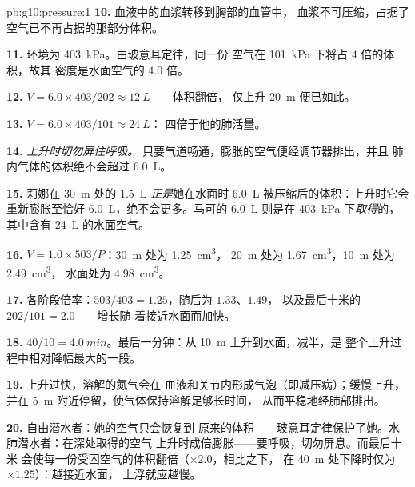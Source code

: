 \begin{solution}{pb:g10:pressure:1}
\textbf{10.} 血液中的血浆转移到胸部的血管中，
血浆不可压缩，占据了空气已不再占据的那部分体积。

\textbf{11.} 环境为 \qty{403}{kPa}。由玻意耳定律，同一份
空气在 \qty{101}{kPa} 下将占 $4$ 倍的体积，故其
密度是水面空气的 $4.0$ 倍。

\textbf{12.} $V = 6.0 \times 403/202 \approx \qty{12}{L}$——体积翻倍，
仅上升 \qty{20}{m} 便已如此。

\textbf{13.} $V = 6.0 \times 403/101 \approx \qty{24}{L}$：
四倍于他的肺活量。

\textbf{14.} \emph{上升时切勿屏住呼吸。}
只要气道畅通，膨胀的空气便经调节器排出，并且
肺内气体的体积绝不会超过 \qty{6.0}{L}。

\textbf{15.} 莉娜在 \qty{30}{m} 处的 \qty{1.5}{L} \emph{正是}她在水面时
\qty{6.0}{L} 被压缩后的体积：上升时它会重新膨胀至恰好
\qty{6.0}{L}，绝不会更多。马可的 \qty{6.0}{L} 则是在
\qty{403}{kPa} 下\emph{取得}的，其中含有 \qty{24}{L} 的水面空气。

\textbf{16.} $V = 1.0 \times 503/P$：\qty{30}{m} 处为 \qty{1.25}{cm^3}，
\qty{20}{m} 处为 \qty{1.67}{cm^3}，\qty{10}{m} 处为 \qty{2.49}{cm^3}，
水面处为 \qty{4.98}{cm^3}。

\textbf{17.} 各阶段倍率：$503/403 = 1.25$，随后为 $1.33$、$1.49$，
以及最后十米的 $202/101 = 2.0$——增长随
着接近水面而加快。

\textbf{18.} $40/10 = \qty{4.0}{min}$。最后一分钟：从
\qty{10}{m} 上升到水面，减半，是
整个上升过程中相对降幅最大的一段。

\textbf{19.} 上升过快，溶解的氮气会在
血液和关节内形成气泡（即减压病）；缓慢上升，
并在 \qty{5}{m} 附近停留，使气体保持溶解足够长时间，
从而平稳地经肺部排出。

\textbf{20.} 自由潜水者：她的空气只会恢复到
原来的体积——玻意耳定律保护了她。水肺潜水者：在深处取得的空气
上升时成倍膨胀——要呼吸，切勿屏息。而最后十米
会使每一份受困空气的体积翻倍（$\times 2.0$，相比之下，
在 \qty{40}{m} 处下降时仅为 $\times 1.25$）：越接近水面，
上浮就应越慢。
\end{solution}
